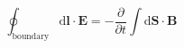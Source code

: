 \[ \oint_{\text{boundary}} \mathrm{d}\boldsymbol{l} \cdot \boldsymbol{E} = -\frac{\partial}{\partial t} \int \mathrm{d}\boldsymbol{S} \cdot \boldsymbol{B} \]
